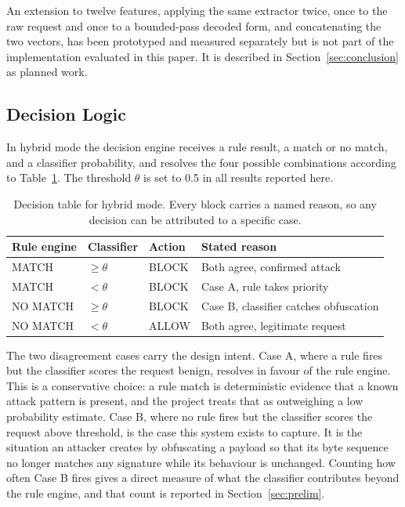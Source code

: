 \documentclass[runningheads]{llncs}
\begin{document}
An extension to twelve features, applying the same extractor twice,
once to the raw request and once to a bounded-pass decoded form, and
concatenating the two vectors, has been prototyped and measured
separately but is not part of the implementation evaluated in this
paper. It is described in Section~\ref{sec:conclusion} as planned work.

\subsection{Decision Logic}
\label{sec:decision}

In hybrid mode the decision engine receives a rule result, a match or
no match, and a classifier probability, and resolves the four possible
combinations according to Table~\ref{tab:decision}. The threshold
$\theta$ is set to 0.5 in all results reported here.

\begin{table}[t]
\centering
\caption{Decision table for hybrid mode. Every block carries a named
reason, so any decision can be attributed to a specific case.}
\label{tab:decision}
\begin{tabular}{llll}
\toprule
Rule engine & Classifier & Action & Stated reason \\
\midrule
MATCH    & $\geq \theta$ & BLOCK & Both agree, confirmed attack \\
MATCH    & $< \theta$    & BLOCK & Case A, rule takes priority \\
NO MATCH & $\geq \theta$ & BLOCK & Case B, classifier catches obfuscation \\
NO MATCH & $< \theta$    & ALLOW & Both agree, legitimate request \\
\bottomrule
\end{tabular}
\end{table}

The two disagreement cases carry the design intent. Case A, where a
rule fires but the classifier scores the request benign, resolves in
favour of the rule engine. This is a conservative choice: a rule match
is deterministic evidence that a known attack pattern is present, and
the project treats that as outweighing a low probability estimate.
Case B, where no rule fires but the classifier scores the request above
threshold, is the case this system exists to capture. It is the
situation an attacker creates by obfuscating a payload so that its byte
sequence no longer matches any signature while its behaviour is
unchanged. Counting how often Case B fires gives a direct measure of
what the classifier contributes beyond the rule engine, and that count
is reported in Section~\ref{sec:prelim}.
\end{document}

